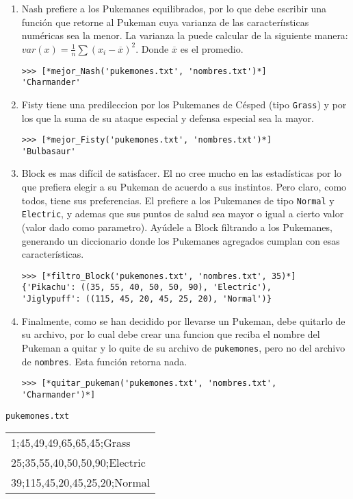 \begin{enumerate}
	\item Nash prefiere a los Pukemanes equilibrados, por lo que debe escribir una función que retorne al Pukeman cuya varianza de las caracteríısticas numéricas sea la menor. La varianza la puede calcular de la siguiente manera: $var(x) = \frac{1}{n}\sum{(x_{i} - \overbar{x})^2}$. Donde $\overbar{x}$ es el promedio.

	\begin{lstlisting}[style=consola]
>>> [*mejor_Nash('pukemones.txt', 'nombres.txt')*]
'Charmander'
	\end{lstlisting}

	\item Fisty tiene una predileccion por los Pukemanes de Césped (tipo \texttt{Grass}) y por los que la suma de su ataque especial y defensa especial sea la mayor.

	\begin{lstlisting}[style=consola]
>>> [*mejor_Fisty('pukemones.txt', 'nombres.txt')*]
'Bulbasaur'
	\end{lstlisting}

	\item Block es mas difícil de satisfacer. El no cree mucho en las estadísticas por lo que prefiera elegir a su Pukeman de acuerdo a sus instintos. Pero claro, como todos, tiene sus preferencias. El prefiere a los Pukemanes de tipo \texttt{Normal} y \texttt{Electric}, y ademas que sus puntos de salud sea mayor o igual a cierto valor (valor dado como parametro). Ayúdele a Block filtrando a los Pukemanes, generando un diccionario donde los Pukemanes agregados cumplan con esas características.

	\begin{lstlisting}[style=consola]
>>> [*filtro_Block('pukemones.txt', 'nombres.txt', 35)*]
{'Pikachu': ((35, 55, 40, 50, 50, 90), 'Electric'),
'Jiglypuff': ((115, 45, 20, 45, 25, 20), 'Normal')}
	\end{lstlisting}

	\item Finalmente, como se han decidido por llevarse un Pukeman, debe quitarlo de su archivo, por lo cual debe crear una funcion que reciba el nombre del Pukeman a quitar y lo quite de su archivo de \texttt{pukemones}, pero no del archivo de \texttt{nombres}. Esta función retorna nada.

	\begin{lstlisting}[style=consola]
>>> [*quitar_pukeman('pukemones.txt', 'nombres.txt', 'Charmander')*]
	\end{lstlisting}

\end{enumerate}

\begin{center}
    \texttt{pukemones.txt} \\
	\begin{tabular}{|l|}
		\hline
            1;45,49,49,65,65,45;Grass\\
            25;35,55,40,50,50,90;Electric\\
            39;115,45,20,45,25,20;Normal\\
		\hline
	\end{tabular}
\end{center}
